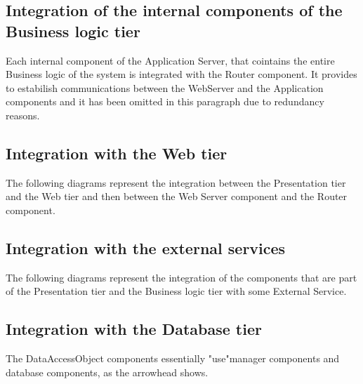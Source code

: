 \documentclass[../DD.tex]{subfiles}
\begin{document}
\subsection{Integration of the internal components of the Business logic tier}
Each internal component of the Application Server, that cointains the entire Business logic of the system is integrated with the Router component. It provides to estabilish communications between the WebServer and the Application components and it has been omitted in this paragraph due to redundancy reasons.


\subsection{Integration with the Web tier}
The following diagrams represent the integration between the Presentation tier and the Web tier and then between the Web Server component and the Router component.


\subsection{Integration with the external services}
The following diagrams represent the integration of the components that are part of the Presentation tier and the Business logic tier with some External Service.


\subsection{Integration with the Database tier}
The DataAccessObject components essentially "use"manager components and database components, as the arrowhead shows.
\end{document}
